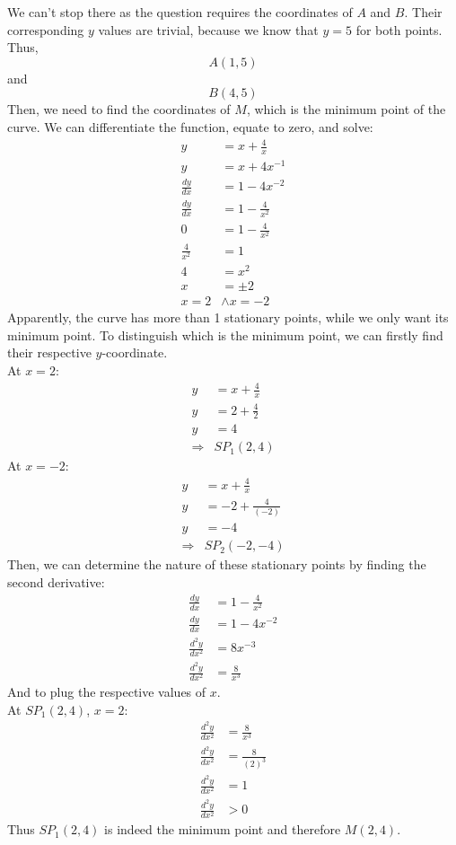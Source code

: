 \documentclass[hidelinks, a4paper, 12pt]{article}
\newcommand{\n}{\\[\baselineskip]}
\newcommand{\thus}{\Rightarrow}
\newcommand{\dydx}{\frac{dy}{dx}}
\newcommand{\dydxx}{\frac{d^2y}{dx^2}}
\begin{document}
            We can't stop there as the question requires the coordinates of $A$ and $B$. Their corresponding $y$ values are trivial, because we know
            that $y=5$ for both points. Thus,
            \[A(1, 5)\]
            and
            \[B(4,5)\]
            Then, we need to find the coordinates of $M$, which is the minimum point of the curve. We can differentiate the function, equate to zero, and solve:
            \[\begin{split}
                y &= x + \frac{4}{x}\\
                y &= x + 4x^{-1}\\
                \dydx &= 1 - 4x^{-2}\\
                \dydx &= 1 - \frac{4}{x^2}\\
                0 &= 1 - \frac{4}{x^2}\\
                \frac{4}{x^2} &= 1\\
                4 &= x^2\\
                x &= \pm 2\\
                x = 2 &\land x = -2 
            \end{split}\]
            Apparently, the curve has more than 1 stationary points, while we only want its minimum point. To distinguish which is the minimum point, we can firstly
            find their respective $y$-coordinate.\n
            At $x=2$:
            \[\begin{split}
                y &= x + \frac{4}{x}\\
                y &= 2 + \frac{4}{2}\\
                y &= 4\\
                \thus &SP_1(2,4)
            \end{split}\]
            At $x=-2$:
            \[\begin{split}
                y &= x + \frac{4}{x}\\
                y &= -2 + \frac{4}{(-2)}\\
                y &= -4\\
                \thus &SP_2(-2,-4)
            \end{split}\]
            Then, we can determine the nature of these stationary points by finding the second derivative:
            \[\begin{split}
                \dydx &= 1 - \frac{4}{x^2}\\
                \dydx &= 1 - 4x^{-2}\\
                \dydxx &= 8x^{-3}\\
                \dydxx &= \frac{8}{x^3}
            \end{split}\]
            And to plug the respective values of $x$.\n
            At $SP_1(2,4)$, $x=2$:
            \[\begin{split}
                \dydxx &= \frac{8}{x^3}\\
                \dydxx &= \frac{8}{(2)^3}\\
                \dydxx &= 1\\
                \dydxx &> 0
            \end{split}\]
            Thus $SP_1(2,4)$ is indeed the minimum point and therefore $M(2,4)$.
        
\end{document}
